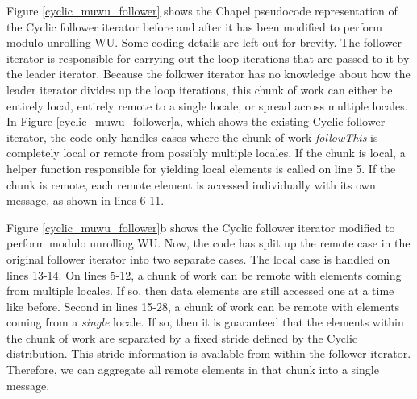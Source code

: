 Figure \ref{cyclic_muwu_follower} shows the Chapel pseudocode representation of the Cyclic follower iterator before and after it has been modified to perform modulo unrolling WU. Some coding details are left out for brevity. The follower iterator is responsible for carrying out the loop iterations that are passed to it by the leader iterator. Because the follower iterator has no knowledge about how the leader iterator divides up the loop iterations, this chunk of work can either be entirely local, entirely remote to a single locale, or spread across multiple locales. In Figure \ref{cyclic_muwu_follower}a, which shows the existing Cyclic follower iterator, the code only handles cases where the chunk of work \textit{followThis} is completely local or remote from possibly multiple locales. If the chunk is local, a helper function responsible for yielding local elements is called on line 5. If the chunk is remote, each remote element is accessed individually with its own message, as shown in lines 6-11. 

Figure \ref{cyclic_muwu_follower}b shows the Cyclic follower iterator modified to perform modulo unrolling WU. Now, the code has split up the remote case in the original follower iterator into two separate cases. The local case is handled on lines 13-14. On lines 5-12, a chunk of work can be remote with elements coming from multiple locales. If so, then data elements are still accessed one at a time like before. Second in lines 15-28, a chunk of work can be remote with elements coming from a \textit{single} locale. If so, then it is guaranteed that the elements within the chunk of work are separated by a fixed stride defined by the Cyclic distribution. This stride information is available from within the follower iterator. Therefore, we can aggregate all remote elements in that chunk into a single message.

